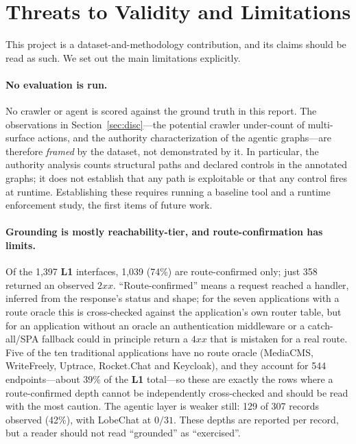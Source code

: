 \documentclass[11pt,a4paper]{article}
\renewcommand{\L}[1]{\textbf{L#1}}
\begin{document}
\section{Threats to Validity and Limitations}\label{sec:limits}
This project is a dataset-and-methodology contribution, and its claims should be read as
such. We set out the main limitations explicitly.

\paragraph{No evaluation is run.} No crawler or agent is scored against the ground truth
in this report. The observations in Section~\ref{sec:disc}---the potential crawler
under-count of multi-surface actions, and the authority characterization of the agentic
graphs---are therefore \emph{framed} by the dataset, not demonstrated by it. In particular,
the authority analysis counts structural paths and declared controls in the annotated graphs;
it does not establish that any path is exploitable or that any control fires at runtime.
Establishing these requires running a baseline tool and a runtime enforcement study, the first
items of future work.

\paragraph{Grounding is mostly reachability-tier, and route-confirmation has limits.} Of
the 1{,}397 \L1 interfaces, 1{,}039 (74\%) are route-confirmed only; just 358 returned an
observed $2xx$. ``Route-confirmed'' means a request reached a handler, inferred from the
response's status and shape; for the seven applications with a route oracle this is
cross-checked against the application's own router table, but for an application without an
oracle an authentication middleware or a catch-all/SPA fallback could in principle return a
$4xx$ that is mistaken for a real route. Five of the ten traditional applications have no
route oracle (MediaCMS, WriteFreely, Uptrace, Rocket.Chat and Keycloak), and they account
for 544 endpoints---about $39\%$ of the \L1 total---so these are exactly the rows where a
route-confirmed depth cannot be independently cross-checked and should be read with the most
caution. The agentic layer is weaker still: 129 of 307 records observed (42\%), with
LobeChat at $0/31$. These depths are reported per record, but
a reader should not read ``grounded'' as ``exercised''.
\end{document}
